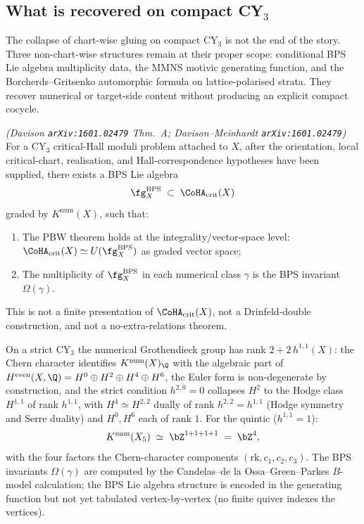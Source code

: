 \subsection{What is recovered on compact CY$_3$}
\label{sec:recovery}

The collapse of chart-wise gluing on compact CY$_3$ is not the end of
the story. Three non-chart-wise structures remain at their proper
scope: conditional BPS Lie algebra multiplicity data, the MMNS motivic
generating function, and the Borcherds--Gritsenko automorphic formula
on lattice-polarised strata. They recover numerical or target-side
content without producing an explicit compact cocycle.

\begin{proposition}
\label{prop:davison-bps}
\emph{(Davison \texttt{arXiv:1601.02479} Thm.~A;
Davison--Meinhardt \texttt{arXiv:1601.02479})}
For a CY$_3$ critical-Hall moduli problem attached to $X$, after the
orientation, local critical-chart, realisation, and Hall-correspondence
hypotheses have been supplied, there exists a BPS Lie algebra
\[
 \fg_X^{\mathrm{BPS}} \;\subset\; \CoHA_{\mathrm{crit}}(X)
\]
graded by $K^{\mathrm{num}}(X)$, such that:
\begin{enumerate}[leftmargin=2em]
\item The PBW theorem holds at the integrality/vector-space level:
 $\CoHA_{\mathrm{crit}}(X) \simeq
 U(\fg_X^{\mathrm{BPS}})$ as graded vector space;
\item The multiplicity of $\fg_X^{\mathrm{BPS}}$ in each numerical class
 $\gamma$ is the BPS invariant $\Omega(\gamma)$.
\end{enumerate}
This is not a finite presentation of $\CoHA_{\mathrm{crit}}(X)$, not a
Drinfeld-double construction, and not a no-extra-relations theorem.
\end{proposition}

On a strict CY$_3$ the numerical Grothendieck group has rank
$2 + 2\,h^{1,1}(X)$: the Chern character identifies
$K^{\mathrm{num}}(X)_\Q$ with the algebraic part of
$H^{\mathrm{even}}(X, \Q) = H^0 \oplus H^2 \oplus H^4 \oplus H^6$,
the Euler form is non-degenerate by construction, and the strict
condition $h^{2,0} = 0$ collapses $H^2$ to the Hodge class $H^{1,1}$
of rank $h^{1,1}$, with $H^4 \simeq H^{2,2}$ dually of rank
$h^{2,2} = h^{1,1}$ (Hodge symmetry and Serre duality) and
$H^0, H^6$ each of rank $1$. For the quintic ($h^{1,1} = 1$):
\[
 K^{\mathrm{num}}(X_5) \;\simeq\; \bZ^{1 + 1 + 1 + 1} \;=\; \bZ^4,
\]
with the four factors the Chern-character components
$(\mathrm{rk}, c_1, c_2, c_3)$. The BPS invariants
$\Omega(\gamma)$ are computed by the Candelas--de la Ossa--Green--Parkes
$B$-model calculation; the BPS Lie algebra structure is encoded in the
generating function but not yet tabulated vertex-by-vertex (no finite
quiver indexes the vertices).

